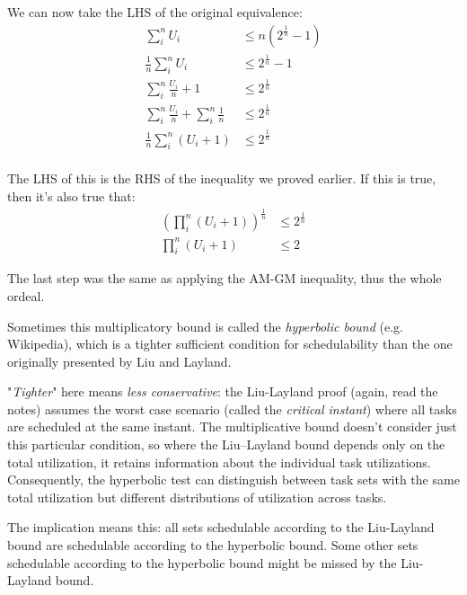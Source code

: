 \documentclass[a4paper,11pt]{article}
\begin{document}
\par\smallskip

We can now take the LHS of the original equivalence:
$$
	\begin{aligned}
		\sum_i^n U_i                                  & \leq n \left( 2^\frac{1}{n} - 1 \right) \\
		\frac{1}{n} \sum_i^n U_i                      & \leq 2^\frac{1}{n} - 1                  \\
		\sum_i^n \frac{U_i}{n} + 1                    & \leq 2^\frac{1}{n}                      \\
		\sum_i^n \frac{U_i}{n} + \sum_i^n \frac{1}{n} & \leq 2^\frac{1}{n}                      \\
		\frac{1}{n} \sum_i^n (U_i + 1)                & \leq 2^\frac{1}{n}                      \\
	\end{aligned}
$$

The LHS of this is the RHS of the inequality we proved earlier.
If this is true, then it's also true that:
$$
	\begin{aligned}
		\left( \prod_i^n (U_i + 1) \right)^\frac{1}{n} & \leq 2^\frac{1}{n} \\
		\prod_i^n (U_i + 1)                            & \leq 2
	\end{aligned}
$$

The last step was the same as applying the AM-GM inequality, thus the whole ordeal.

Sometimes this multiplicatory bound is called the \textit{hyperbolic bound} (e.g. Wikipedia), which is a tighter sufficient condition for schedulability than the one originally presented by Liu and Layland.

"\textit{Tighter}" here means \textit{less conservative}: the Liu-Layland proof (again, read the notes) assumes the worst case scenario (called the \textit{critical instant}) where all tasks are scheduled at the same instant.
The multiplicative bound doesn't consider just this particular condition, so where the Liu–Layland bound depends only on the total utilization, it retains information about the individual task utilizations. Consequently, the hyperbolic test can distinguish between task sets with the same total utilization but different distributions of utilization across tasks.

The implication means this: all sets schedulable according to the Liu-Layland bound are schedulable according to the hyperbolic bound.
Some other sets schedulable according to the hyperbolic bound might be missed by the Liu-Layland bound.
\end{document}
